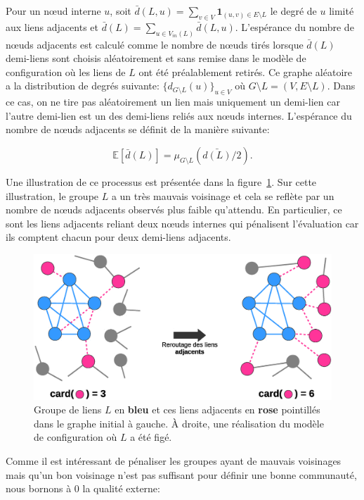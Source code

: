 Pour un n\oe{}ud interne $u$, soit $\bar{d}(L,u) = \sum_{v \in V} \mathbf{1}_{(u,v) \in E \setminus L}$ le degré de $u$ limité aux liens adjacents et $\bar{d}(L)=\sum_{u \in V_{in}(L)} \bar{d}(L,u)$.
L'espérance du nombre de n\oe{}uds adjacents est calculé comme le nombre de n\oe{}uds tirés lorsque $\bar{d}(L)$ demi-liens sont choisis aléatoirement et sans remise dans le modèle de configuration où les liens de $L$ ont été préalablement retirés.
Ce graphe aléatoire a la distribution de degrés suivante: $\{d_{G \setminus L }(u)\}_{u \in V}$ où $G \setminus L = (V,E\setminus L)$.
Dans ce cas, on ne tire pas aléatoirement un lien mais uniquement un demi-lien car l'autre demi-lien est un des demi-liens reliés aux n\oe{}uds internes.
L'espérance du nombre de n\oe{}uds adjacents se définit de la manière suivante:

\begin{equation}
	\mathbb{E}[\bar{d}(L)] = \mu_{G\setminus L}(\bar{d(L)}/2).
\end{equation}

Une illustration de ce processus est présentée dans la figure~\ref{fig:retourt_ext}.
Sur cette illustration, le groupe $L$ a un très mauvais voisinage et cela se reflète par un nombre de n\oe{}uds adjacents observés plus faible qu'attendu.
En particulier, ce sont les liens adjacents reliant deux n\oe{}uds internes qui pénalisent l'évaluation car ils comptent chacun pour deux demi-liens adjacents.

\begin{figure}
\centering
\includegraphics[width=0.7\linewidth]{img/ExpectedNodes/reroutageExt3}
\caption{Groupe de liens $L$ en \textcolor{semilightblue}{\textbf{bleu}} et ces liens adjacents en \textcolor{pinkyred}{\textbf{rose}} pointillés dans le graphe initial à gauche.
\`A droite, une réalisation du modèle de configuration où $L$ a été figé.}
\label{fig:retourt_ext}
\end{figure}

Comme il est intéressant de pénaliser les groupes ayant de mauvais voisinages mais qu'un bon voisinage n'est pas suffisant pour définir une bonne communauté, nous bornons à $0$ la qualité externe:

